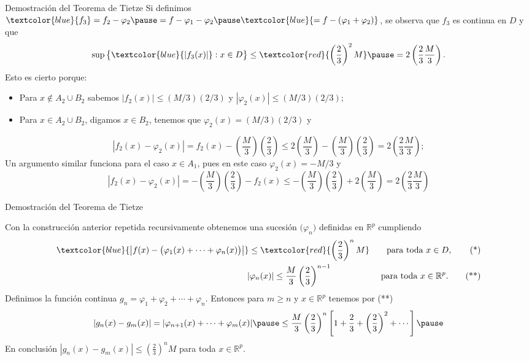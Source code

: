 \documentclass[xcolor=dvipsnames,10pt,handout, draft]{beamer}
\newcommand{\rzp}{\mathbb R^{p}}
\begin{document}
\begin{frame}{Demostraci\'on del Teorema de Tietze}
Si definimos $\textcolor{blue}{f_3}=f_2-\varphi_2\pause=f-\varphi_1-\varphi_2\pause\textcolor{blue}{=f-(\varphi_1+\varphi_2)}$, \pause se observa que $f_3$ es continua en $D$ y que $$\sup\big\{\textcolor{blue}{|f_3(x)|}:x\in D\big\}\leq \textcolor{red}{\left(\frac{2}{3}\right)^2M}\pause=2\left(\frac{2}{3}\frac{M}{3}\right).$$
Esto es cierto porque:\pause\vskip5pt
\begin{itemize}
\item Para $x\not\in A_2\cup B_2$ sabemos $|f_2(x)|\leq (M/3)(2/3)$ y $|\varphi_2(x)|\leq (M/3)(2/3)$;\pause
\item Para $x\in A_2\cup B_2$, digamos $x\in B_2$, tenemos que $\varphi_2(x)=(M/3)(2/3)$ y \pause
\end{itemize}\vskip4pt
$$|f_2(x)-\varphi_2(x)|=f_2(x)-\left(\frac{M}{3}\right)\left(\frac{2}{3}\right)\leq 2\left(\frac{M}{3}\right)-\left(\frac{M}{3}\right)\left(\frac{2}{3}\right)=2\left(\frac{2}{3}\frac{M}{3}\right);$$ \pause Un argumento similar funciona para el caso $x\in A_1$, pues en este caso $\varphi_2(x)=-M/3$ y 
$$|f_2(x)-\varphi_2(x)|=-\left(\frac{M}{3}\right)\left(\frac{2}{3}\right)-f_2(x)\leq -\left(\frac{M}{3}\right)\left(\frac{2}{3}\right)+2\left(\frac{M}{3}\right)=2\left(\frac{2}{3}\frac{M}{3}\right)$$

\end{frame}


\begin{frame}{Demostraci\'on del Teorema de Tietze}

Con la construcci\'on anterior repetida recursivamente obtenemos una sucesi\'on $\big(\varphi_n\big)$ definidas en $\rzp$ cumpliendo\pause
\begin{align}
\textcolor{blue}{\left|f(x)-\big(\varphi_1(x)+\cdots+\varphi_n(x)\big)\right|}\leq\textcolor{red}{\left(\frac{2}{3}\right)^nM}\qquad\text{para toda }x\in D,\tag{*}\\
|\varphi_n(x)|\leq \frac{M}{3}\left(\frac{2}{3}\right)^{n-1}\hskip2cm\text{para toda }x\in \rzp.\tag{**}
\end{align}\pause
Definimos la funci\'on continua $g_n=\varphi_1+\varphi_2+\cdots+\varphi_n$. \pause Entonces para $m\geq n$ y $x\in \rzp$ tenemos por (**)
$$|g_n(x)-g_m(x)|=|\varphi_{n+1}(x)+\cdots+\varphi_m(x)|\pause\leq\frac{M}{3}\left(\frac{2}{3}\right)^n\left[1+\frac{2}{3}+\left(\frac{2}{3}\right)^2+\cdots\right]\pause$$
En conclusi\'on $\displaystyle |g_n(x)-g_m(x)|\leq\left(\frac{2}{3}\right)^nM$ para toda $x\in \rzp$.

\end{frame}
\end{document}
